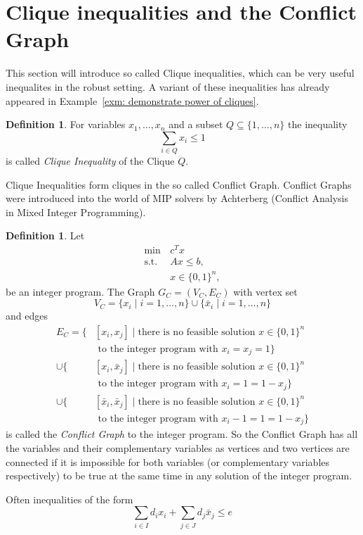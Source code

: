 \documentclass[titlepage, a4paper]{amsbook}
\theoremstyle{plain}
\theoremstyle{break}
\theoremstyle{definition}
\newtheorem{dfn}[thm]{Definition}
\theoremstyle{remark}
\numberwithin{equation}{thm}
\begin{document}
\section{Clique inequalities and the Conflict Graph}
This section will introduce so called Clique inequalities, which can be very useful inequalites in the robust setting. A variant of these inequalities has already appeared in Example~\ref{exm: demonstrate power of cliques}.
\begin{dfn}
For variables $x_1, \ldots, x_n$ and a subset $Q \subseteq \{1, \ldots, n\}$ the inequality
\[\sum_{i \in Q}x_i \leq 1\]
is called \emph{Clique Inequality} of the Clique $Q$.
\end{dfn}
Clique Inequalities form cliques in the so called Conflict Graph. Conflict Graphs were introduced into the world of MIP solvers by Achterberg (Conflict Analysis in Mixed Integer Programming).
\begin{dfn}\label{dfn: conflict graph}
Let 
\begin{align*}
    \min\,&c^T x \\
    \text{s.t. } &Ax \leq b, \\
    &x \in \{0,1\}^n,
\end{align*}
be an integer program. The Graph $G_C=(V_C, E_C)$ with 
vertex set 
\[V_C = \{x_i \mid i=1, \ldots, n\} \cup \{\bar{x}_i \mid i=1, \ldots, n\}\]
and edges
\begin{align*}
E_C=\{&[x_i, x_j] \mid \text{there is no feasible solution }x \in \{0,1\}^n \\& \text{ to the integer program with }x_i=x_j=1 \} \\
\cup \{&[x_i, \bar{x}_j] \mid \text{there is no feasible solution }x \in \{0,1\}^n \\& \text{ to the integer program with }x_i=1=1-x_j \} \\
\cup \{&[\bar{x}_i, \bar{x}_j] \mid \text{there is no feasible solution }x \in \{0,1\}^n \\&\text{ to the integer program with }x_i-1=1=1-x_j \}
\end{align*}
is called the \emph{Conflict Graph} to the integer program.
So the Conflict Graph has all the variables and their complementary variables as vertices and two vertices are connected if it is impossible for both variables (or complementary variables respectively) to be true at the same time in any solution of the integer program.
\end{dfn}
Often inequalities of the form
\[\sum_{i \in I}d_i x_i + \sum_{j \in J}d_j\bar{x}_j \leq e\]
\end{document}
